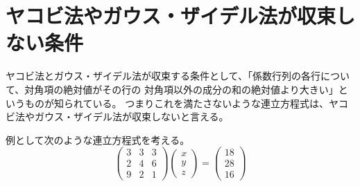 \documentclass[titlepage]{jsarticle}
\begin{document}
	\section{ヤコビ法やガウス・ザイデル法が収束しない条件}
		ヤコビ法とガウス・ザイデル法が収束する条件として、「係数行列の各行について、対角項の絶対値がその行の
		対角項以外の成分の和の絶対値より大きい」というものが知られている。\cite{yakobi}
		つまりこれを満たさないような連立方程式は、ヤコビ法やガウス・ザイデル法が収束しないと言える。
	
		例として次のような連立方程式を考える。
		 \begin{equation*}
	            \left(
	                \begin{array}{ccc}
	                    3 & 3 & 3 \\
	                    2 & 4 & 6 \\
	                    9 & 2 & 1
	                \end{array}
	            \right)\left(
	                \begin{array}{c}
	                    x \\
	                    y \\
	                    z
	                \end{array}
	            \right) = \left(
	                \begin{array}{c}
	                    18 \\
	                    28 \\
	                    16
	                \end{array}
	            \right)
        \end{equation*}
\end{document}
